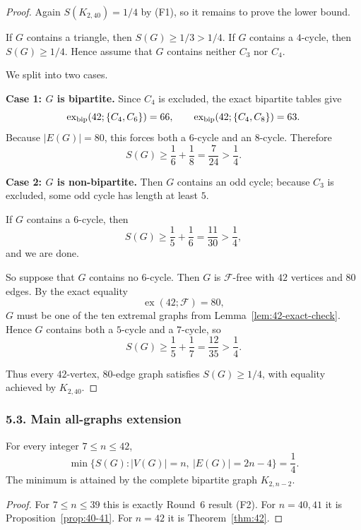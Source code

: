 \begin{proof}
Again $S(K_{2,40})=1/4$ by (F1), so it remains to prove the lower bound.

If $G$ contains a triangle, then $S(G)\ge 1/3>1/4$.
If $G$ contains a $4$-cycle, then $S(G)\ge 1/4$.
Hence assume that $G$ contains neither $C_3$ nor $C_4$.

We split into two cases.

\medskip
\noindent\textbf{Case 1: $G$ is bipartite.}
Since $C_4$ is excluded, the exact bipartite tables give
\[
\operatorname{ex}_{\rm bip}(42;\{C_4,C_6\})=66,\qquad
\operatorname{ex}_{\rm bip}(42;\{C_4,C_8\})=63.
\]
Because $|E(G)|=80$, this forces both a $6$-cycle and an $8$-cycle.
Therefore
\[
S(G)\ge \frac16+\frac18=\frac7{24}>\frac14.
\]

\medskip
\noindent\textbf{Case 2: $G$ is non-bipartite.}
Then $G$ contains an odd cycle; because $C_3$ is excluded, some odd cycle has length at least $5$.

If $G$ contains a $6$-cycle, then
\[
S(G)\ge \frac15+\frac16=\frac{11}{30}>\frac14,
\]
and we are done.

So suppose that $G$ contains no $6$-cycle.
Then $G$ is $\mathcal F$-free with $42$ vertices and $80$ edges.
By the exact equality
\[
\operatorname{ex}(42;\mathcal F)=80,
\]
$G$ must be one of the ten extremal graphs from Lemma~\ref{lem:42-exact-check}.
Hence $G$ contains both a $5$-cycle and a $7$-cycle, so
\[
S(G)\ge \frac15+\frac17=\frac{12}{35}>\frac14.
\]

Thus every $42$-vertex, $80$-edge graph satisfies $S(G)\ge 1/4$, with equality achieved by $K_{2,40}$.
\end{proof}

\subsubsection*{5.3. Main all-graphs extension}

\begin{theorem}[The $K_{2,n-2}$ line through $n=42$]\label{thm:all-through-42}
For every integer $7\le n\le 42$,
\[
\min\{S(G): |V(G)|=n,\ |E(G)|=2n-4\}=\frac14.
\]
The minimum is attained by the complete bipartite graph $K_{2,n-2}$.
\end{theorem}

\begin{proof}
For $7\le n\le 39$ this is exactly Round~6 result (F2).
For $n=40,41$ it is Proposition~\ref{prop:40-41}.
For $n=42$ it is Theorem~\ref{thm:42}.
\end{proof}

